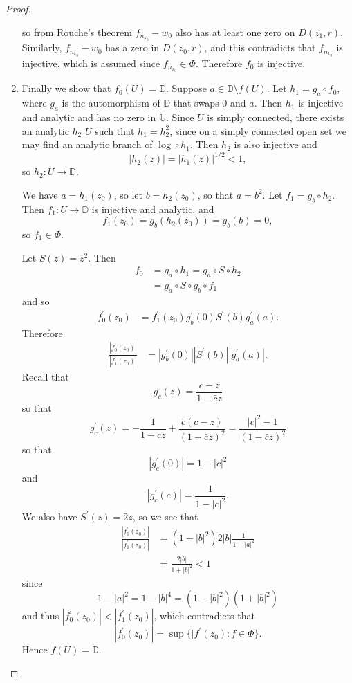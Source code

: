 \begin{proof}
\begin{enumerate}
{    so from Rouche's theorem $f_{n_{k_0}} - w_0$ also has at least one
    zero on $D(z_1, r)$. Similarly, $f_{n_{k_0}} - w_0$ has a zero in
    $D(z_0, r)$, and this contradicts that $f_{n_{k_0}}$ is injective,
    which is assumed since $f_{n_{k_0}} \in \Phi$.
    Therefore $f_0$ is injective.
  }
  \item{
    Finally we show that $f_0(U) = \mathbb{D}$. Suppose
    $a \in \mathbb{D} \setminus f(U)$. Let
    $h_1 = g_a \circ f_0$, where $g_a$ is the automorphism of
    $\mathbb{D}$ that swaps 0 and $a$. Then $h_1$ is injective
    and analytic and has no zero in $\mathbb{U}$. Since
    $U$ is simply connected, there exists an analytic $h_2$
    $U$ such that $h_1 = h_2^2$, since on a simply connected open
    set we may find an analytic branch of $\log \circ h_1$.  Then
    $h_2$ is also injective and
    $$
      |h_2(z)|
    = |h_1(z)|^{1 / 2}
    < 1,
    $$
    so $h_2 : U \to \mathbb{D}$.

    We have $a = h_1(z_0)$, so let $b = h_2(z_0)$, so that $a = b^2$.
    Let $f_1 = g_b \circ h_2$. Then $f_1 : U \to \mathbb{D}$ is
    injective and analytic, and
    $$
      f_1(z_0)
    = g_b(h_2(z_0))
    = g_b(b)
    = 0,
    $$
    so $f_1 \in \Phi$.

    Let $S(z) = z^2$. Then
    \begin{align*}
       f_0
    &= g_a \circ h_1
     = g_a \circ S \circ h_2 \\
    &= g_a \circ S \circ g_b \circ f_1
    \end{align*}
    and so
    \begin{align*}
       f_0^\prime(z_0)
    &= f_1^\prime(z_0)
       g_b^\prime(0)
       S^\prime(b)
       g_a^\prime(a).
    \end{align*}
    Therefore
    \begin{align*}
       \frac{|f_0^\prime(z_0)|}
            {|f_1^\prime(z_0)|}
    &= |g_b^\prime(0)|
       |S^\prime(b)|
       |g_a^\prime(a)|.
    \end{align*}
    Recall that
    $$
      g_c(z)
    = \frac{c - z}
           {1 - \bar{c} z}
    $$
    so that
    $$
      g_c^\prime(z)
    = - \frac{1}
             {1 - \bar{c} z}
      + \frac{\bar{c}(c - z)}
             {(1 - \bar{c} z)^2}
    = \frac{|c|^2 - 1}
           {(1 - \bar{c} z)^2}
    $$
    so that
    $$
      |g_c^\prime(0)|
    = 1 - |c|^2
    $$
    and
    $$
      |g_c^\prime(c)|
    = \frac{1}{1 - |c|^2}.
    $$
    We also have $S^\prime(z) = 2z$, so we see that
    \begin{align*}
       \frac{|f_0^\prime(z_0)|}
            {|f_1^\prime(z_0)|}
    &= (1 - |b|^2) 2|b| \frac{1}{1 - |a|^2} \\
    &= \frac{2|b|}{1 + |b|^2}
     < 1
    \end{align*}
    since
    $$
      1 - |a|^2
    = 1 - |b|^4
    = (1 - |b|^2)(1 + |b|^2)
    $$
    and thus $|f_0^\prime(z_0)| < |f_1^\prime(z_0)|$, which
    contradicts that
    $$
      |f_0^\prime(z_0)|
    = \sup \{ |f^\prime(z_0) : f \in \Phi \}.
    $$
    Hence $f(U) = \mathbb{D}$.
  }
\end{enumerate}
\end{proof}

